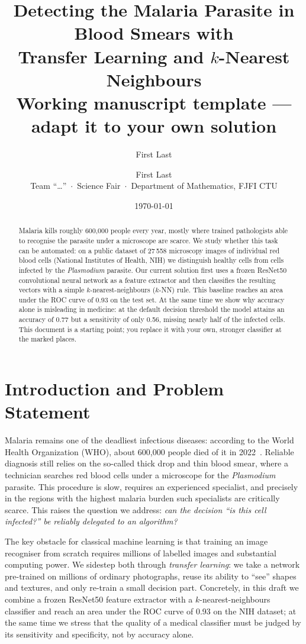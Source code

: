 \documentclass[11pt]{article}
\title{\textbf{Detecting the Malaria Parasite in Blood Smears with\\
Transfer Learning and $k$-Nearest Neighbours}\\[4pt]
\large\textnormal{Working manuscript template --- adapt it to your own solution}}
\author{First Last \and First Last\\[2pt]
\small Team ``\dots'' \,$\cdot$\, Science Fair \,$\cdot$\, Department of Mathematics, FJFI CTU}
\date{\today}
\newcommand{\Ntotal}{27\,558}
\newcommand{\knnAcc}{0.77}      %
\newcommand{\knnSens}{0.56}     %
\newcommand{\knnAUC}{0.93}
\begin{document}
\maketitle

\begin{abstract}
\noindent
Malaria kills roughly 600{,}000 people every year, mostly where trained pathologists able to
recognise the parasite under a microscope are scarce. We study whether this task can be
automated: on a public dataset of \Ntotal{} microscopy images of individual red blood cells
(National Institutes of Health, NIH) we distinguish healthy cells from cells infected by the
\emph{Plasmodium} parasite. Our current solution first uses a frozen ResNet50 convolutional
neural network as a feature extractor and then classifies the resulting vectors with a simple
$k$-nearest-neighbours ($k$-NN) rule. This baseline reaches an area under the ROC curve of
\knnAUC{} on the test set. At the same time we show why accuracy alone is misleading in
medicine: at the default decision threshold the model attains an accuracy of \knnAcc{} but a
sensitivity of only \knnSens{}, missing nearly half of the infected cells. This document is a
starting point; you replace it with your own, stronger classifier at the marked places.
\end{abstract}

\section{Introduction and Problem Statement}
\label{sec:intro}

Malaria remains one of the deadliest infectious diseases: according to the World Health
Organization (WHO), about 600{,}000 people died of it in 2022~\cite{who2023}. Reliable
diagnosis still relies on the so-called thick drop and thin blood smear, where a technician
searches red blood cells under a microscope for the \emph{Plasmodium} parasite. This procedure
is slow, requires an experienced specialist, and precisely in the regions with the highest
malaria burden such specialists are critically scarce. This raises the question we address:
\emph{can the decision ``is this cell infected?'' be reliably delegated to an algorithm?}

The key obstacle for classical machine learning is that training an image recogniser from
scratch requires millions of labelled images and substantial computing power. We sidestep both
through \emph{transfer learning}: we take a network pre-trained on millions of ordinary
photographs, reuse its ability to ``see'' shapes and textures, and only re-train a small
decision part. Concretely, in this draft we combine a frozen ResNet50 feature extractor with a
$k$-nearest-neighbours classifier and reach an area under the ROC curve of \knnAUC{} on the NIH
dataset; at the same time we stress that the quality of a medical classifier must be judged by
its sensitivity and specificity, not by accuracy alone.
\end{document}
